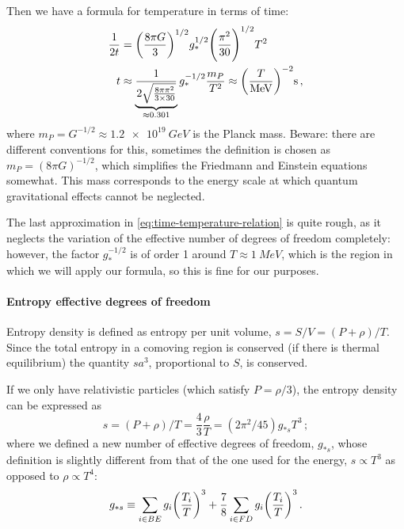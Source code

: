 \documentclass[main.tex]{subfiles}
\begin{document}
Then we have a formula for temperature in terms of time: 
%
\begin{align}
  \frac{1}{2t} &= \qty(\frac{8 \pi G}{3})^{1/2} g_{*}^{1/2} \qty(\frac{\pi^2}{30})^{1/2} T^2 \\
  t &\approx \underbrace{\frac{1}{2 \sqrt{\frac{8 \pi \pi^2}{3 \times 30}}}}_{\approx\num{.301}} g_{*}^{-1/2} \frac{m_P}{T^2} \approx \qty(\frac{T}{\SI{}{MeV}})^{-2} \SI{}{s}
  \label{eq:time-temperature-relation}
\,,
\end{align}
%
where \(m_P  = G^{-1/2} \approx \SI{1.2e19}{GeV}\) is the Planck mass. Beware: there are different conventions for this, sometimes the definition is chosen as \(m_P = (8 \pi G)^{-1/2}\), which simplifies the Friedmann and Einstein equations somewhat. 
This mass corresponds to the energy scale at which quantum gravitational effects cannot be neglected.

The last approximation in \eqref{eq:time-temperature-relation} is quite rough, as it neglects the variation of the effective number of degrees of freedom completely: however, the factor \(g_{*}^{-1/2}\) is of order 1 around \(T \approx \SI{1}{MeV}\), which is the region in which we will apply our formula, so this is fine for our purposes.






\paragraph{Entropy effective degrees of freedom}

Entropy density is defined as entropy per unit volume, \(s = S / V = (P+\rho ) / T\). Since the total entropy in a comoving region is conserved (if there is thermal equilibrium) the quantity \(s a^3\), proportional to \(S\), is conserved. 

If we only have relativistic particles (which satisfy \(P = \rho / 3\)), the entropy density can be expressed as 
%
\begin{equation}
s = (P + \rho ) / T = \frac{4}{3} \frac{\rho}{T} = (2 \pi^2 / 45) g_{* s} T^{3} 
\,;
\end{equation}
%
where we defined a new number of effective degrees of freedom, \(g_{*s}\), whose definition is slightly different from that of the one used for the energy, \(s \propto T^3\) as opposed to \(\rho \propto T^{4}\): 
%
\begin{equation}
  g_{* s} \equiv \sum _{i \in BE} g_i \qty(\frac{T_i}{T})^3
  + \frac{7}{8} \sum _{i \in FD} g_i \qty(\frac{T_i}{T})^3
\,.
\end{equation}
\end{document}
